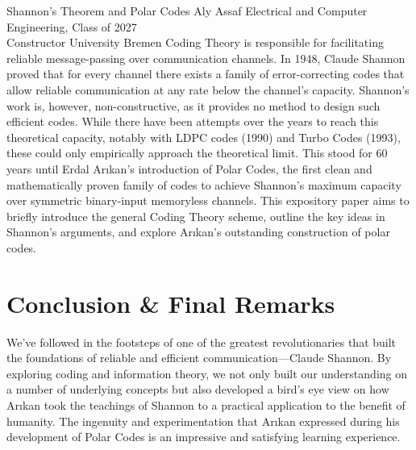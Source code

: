 \label{art:shannon}

\articleheader
  {Shannon's Theorem and Polar Codes}
  {Aly Assaf}
  {Electrical and Computer Engineering, Class of 2027\\Constructor University Bremen}
  {Coding Theory is responsible for facilitating reliable message-passing
   over communication channels.  In 1948, Claude Shannon proved that for
   every channel there exists a family of error-correcting codes that allow
   reliable communication at any rate below the channel's capacity.
   Shannon's work is, however, non-constructive, as it provides no method
   to design such efficient codes.  While there have been attempts over the
   years to reach this theoretical capacity, notably with LDPC codes (1990)
   and Turbo Codes (1993), these could only empirically approach the
   theoretical limit.  This stood for 60 years until Erdal Ar{\i}kan's
   introduction of Polar Codes, the first clean and mathematically proven
   family of codes to achieve Shannon's maximum capacity over symmetric
   binary-input memoryless channels.  This expository paper aims to briefly
   introduce the general Coding Theory scheme, outline the key ideas in
   Shannon's arguments, and explore Ar{\i}kan's outstanding construction of
   polar codes.}












\section{Conclusion \& Final Remarks}

We've followed in the footsteps of one of the greatest revolutionaries that
built the foundations of reliable and efficient communication---Claude
Shannon.  By exploring coding and information theory, we not only built our
understanding on a number of underlying concepts but also developed a bird's
eye view on how Ar{\i}kan took the teachings of Shannon to a practical
application to the benefit of humanity.  The ingenuity and experimentation
that Ar{\i}kan expressed during his development of Polar Codes is an
impressive and satisfying learning experience.

